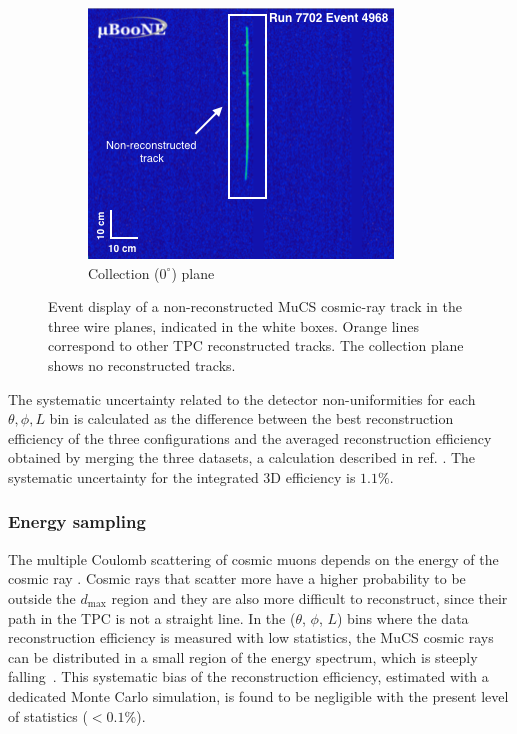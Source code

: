 \documentclass[a4paper,11pt]{article}
\begin{document}
\begin{figure}[htbp]
\begin{center}
    \begin{subfigure}{0.5\textwidth}
      \includegraphics[width=\linewidth]{figures/y.png}
      \caption{Collection ($0^{\circ}$) plane} \label{fig:y}
    \end{subfigure}    \caption{Event display of a non-reconstructed MuCS cosmic-ray track in the three wire planes, indicated in the white boxes. Orange lines correspond to other TPC reconstructed tracks. The collection plane shows no reconstructed tracks.} \label{fig:example}
  \end{center}
\end{figure}

The systematic uncertainty related to the detector non-uniformities for each $\theta,\phi,L$ bin is calculated as the difference between the best reconstruction efficiency of the three configurations and the averaged reconstruction efficiency obtained by merging the three datasets, a calculation described in ref. \cite{besiii}. The systematic uncertainty for the integrated 3D efficiency is $1.1\%$.

\subsubsection{Energy sampling}
The multiple Coulomb scattering of cosmic muons depends on the energy of the cosmic ray \cite{pdg}. Cosmic rays that scatter more have a higher probability to be outside the $d_{\mathrm{max}}$ region and they are also more difficult to reconstruct, since their path in the TPC is not a straight line. In the ($\theta$, $\phi$, $L$) bins where the data reconstruction efficiency is measured with low statistics, the MuCS cosmic rays can be distributed in a small region of the energy spectrum, which is steeply falling~\cite{corsika}. This systematic bias of the reconstruction efficiency, estimated with a dedicated Monte Carlo simulation, is found to be negligible with the present level of statistics ($<0.1\%$).
\end{document}
